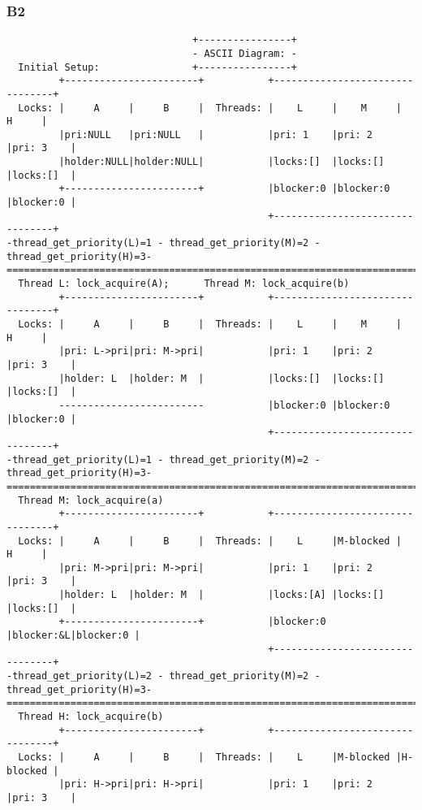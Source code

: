 \documentclass[a4wide, 11pt]{article}
\begin{document}
\subsubsection{B2}
\begin{verbatim}
                                +----------------+
                                - ASCII Diagram: -
  Initial Setup:                +----------------+
         +-----------------------+           +--------------------------------+
  Locks: |     A     |     B     |  Threads: |    L     |    M     |    H     |
         |pri:NULL   |pri:NULL   |           |pri: 1    |pri: 2    |pri: 3    |
         |holder:NULL|holder:NULL|           |locks:[]  |locks:[]  |locks:[]  |
         +-----------------------+           |blocker:0 |blocker:0 |blocker:0 |
                                             +--------------------------------+
-thread_get_priority(L)=1 - thread_get_priority(M)=2 - thread_get_priority(H)=3-
================================================================================
  Thread L: lock_acquire(A);      Thread M: lock_acquire(b) 
         +-----------------------+           +--------------------------------+
  Locks: |     A     |     B     |  Threads: |    L     |    M     |    H     |
         |pri: L->pri|pri: M->pri|           |pri: 1    |pri: 2    |pri: 3    |
         |holder: L  |holder: M  |           |locks:[]  |locks:[]  |locks:[]  |
         -------------------------           |blocker:0 |blocker:0 |blocker:0 |
                                             +--------------------------------+
-thread_get_priority(L)=1 - thread_get_priority(M)=2 - thread_get_priority(H)=3-
================================================================================
  Thread M: lock_acquire(a) 
         +-----------------------+           +--------------------------------+
  Locks: |     A     |     B     |  Threads: |    L     |M-blocked |    H     |
         |pri: M->pri|pri: M->pri|           |pri: 1    |pri: 2    |pri: 3    |
         |holder: L  |holder: M  |           |locks:[A] |locks:[]  |locks:[]  |
         +-----------------------+           |blocker:0 |blocker:&L|blocker:0 |
                                             +--------------------------------+
-thread_get_priority(L)=2 - thread_get_priority(M)=2 - thread_get_priority(H)=3-
================================================================================
  Thread H: lock_acquire(b)
         +-----------------------+           +--------------------------------+
  Locks: |     A     |     B     |  Threads: |    L     |M-blocked |H-blocked |
         |pri: H->pri|pri: H->pri|           |pri: 1    |pri: 2    |pri: 3    |

\end{verbatim}
\end{document}
